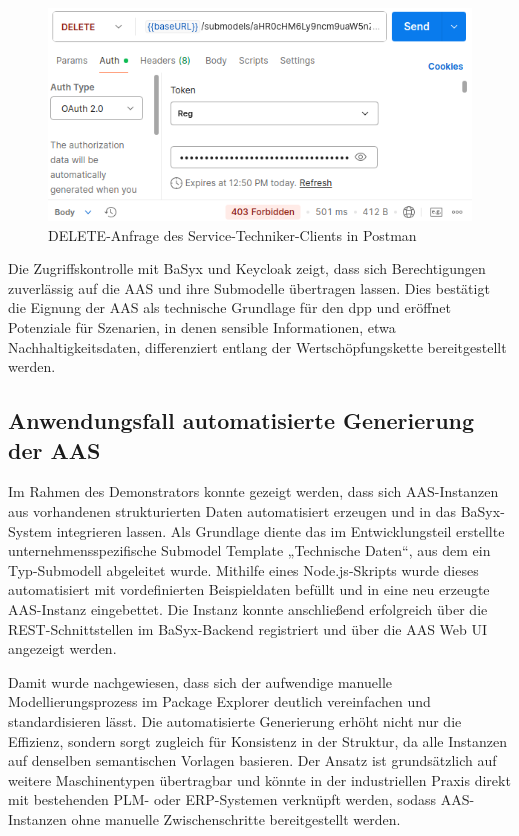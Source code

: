 \begin{figure}[htbp]
    \centering
        \includegraphics{Bilder/Ergebnisse/DPP/Postman/TechnicianDelet.png}
    \caption{DELETE-Anfrage des Service-Techniker-Clients in Postman}
    \label{fig:KeycloakAnmeldeSeite}
\end{figure}

Die Zugriffskontrolle mit BaSyx und Keycloak zeigt, dass sich Berechtigungen zuverlässig auf die AAS und ihre Submodelle übertragen lassen.
Dies bestätigt die Eignung der AAS als technische Grundlage für den \acs{dpp} und eröffnet Potenziale für Szenarien, in denen sensible Informationen, etwa Nachhaltigkeitsdaten, differenziert entlang der Wertschöpfungskette bereitgestellt werden.

\subsection{Anwendungsfall automatisierte Generierung der AAS}

Im Rahmen des Demonstrators konnte gezeigt werden, dass sich AAS-Instanzen aus vorhandenen strukturierten Daten automatisiert erzeugen und in das BaSyx-System integrieren lassen. 
Als Grundlage diente das im Entwicklungsteil erstellte unternehmensspezifische Submodel Template „Technische Daten“, aus dem ein Typ-Submodell abgeleitet wurde. 
Mithilfe eines Node.js-Skripts wurde dieses automatisiert mit vordefinierten Beispieldaten befüllt und in eine neu erzeugte AAS-Instanz eingebettet. 
Die Instanz konnte anschließend erfolgreich über die REST-Schnittstellen im BaSyx-Backend registriert und über die AAS Web UI angezeigt werden. 

Damit wurde nachgewiesen, dass sich der aufwendige manuelle Modellierungsprozess im Package Explorer deutlich vereinfachen und standardisieren lässt. 
Die automatisierte Generierung erhöht nicht nur die Effizienz, sondern sorgt zugleich für Konsistenz in der Struktur, da alle Instanzen auf denselben semantischen Vorlagen basieren. 
Der Ansatz ist grundsätzlich auf weitere Maschinentypen übertragbar und könnte in der industriellen Praxis direkt mit bestehenden PLM- oder ERP-Systemen verknüpft werden, sodass AAS-Instanzen ohne manuelle Zwischenschritte bereitgestellt werden. 

